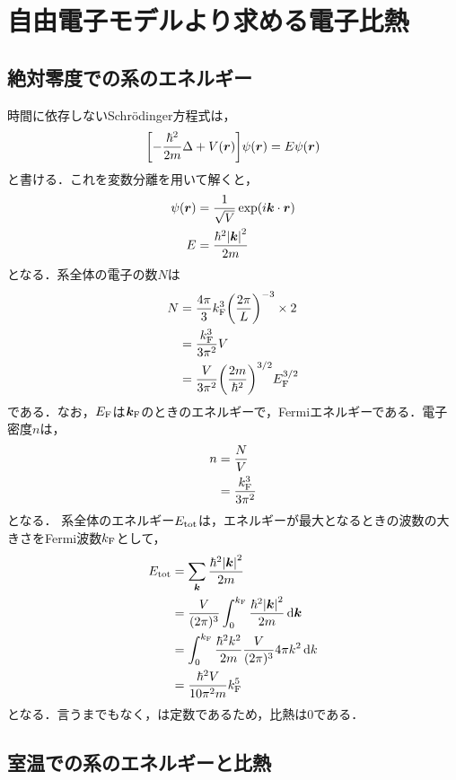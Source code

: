 \documentclass{report}
\begin{document}
  \chapter{自由電子モデルより求める電子比熱}
    \section{絶対零度での系のエネルギー}
      時間に依存しないSchr\"odinger方程式は，
      \begin{align}
        \qty[-\frac{\hbar^2}{2m}\Delta + V(\bm{r})]\psi(\bm{r}) = E\psi(\bm{r})
      \end{align}
      と書ける．これを変数分離を用いて解くと，
      \begin{align}
        \psi(\bm{r}) &= \frac{1}{\sqrt{V}}\exp(i\bm{k}\cdot\bm{r}) \\ 
        E &= \frac{\hbar^2\abs{\bm{k}}^2}{2m}
      \end{align}
      となる．系全体の電子の数$N$は
      \begin{align}
        N &= \frac{4\pi}{3}k_{\mathrm{F}}^3   \qty(\frac{2\pi}{L})^{-3} \times 2 \\ 
        &= \frac{k_{\mathrm{F}}^3}{3\pi^2}V \\ 
        &= \frac{V}{3\pi^2}\qty(\frac{2m}{\hbar^2})^{3/2}E_{\mathrm{F}}^{3/2} \label{electron-number}
      \end{align}
      である．なお，$E_{\mathrm{F}}$は$\bm{k}_{\mathrm{F}}$のときのエネルギーで，Fermiエネルギーである．電子密度$n$は，
      \begin{align}
        n &= \frac{N}{V} \\ 
        &= \frac{k_{\mathrm{F}}^3}{3\pi^2} \label{electron-density}
      \end{align}
      となる．
      系全体のエネルギー$E_{\mathrm{tot}}$は，エネルギーが最大となるときの波数の大きさをFermi波数$k_{\mathrm{F}}$として，
      \begin{align}
        E_{\mathrm{tot}} &= \sum_{\bm{k}}\frac{\hbar^2\abs{\bm{k}}^2}{2m} \\
        &= \frac{V}{(2\pi)^3}\int_{0}^{k_{\mathrm{F}}} \frac{\hbar^2\abs{\bm{k}}^2}{2m} \dd{\bm{k}}\\
        &= \int_{0}^{k_{\mathrm{F}}} \frac{\hbar^2k^2}{2m} \frac{V}{(2\pi)^3}4\pi k^2 \dd{k} \\
        &= \frac{\hbar^2 V}{10\pi^2m}k_{\mathrm{F}}^5 \label{electron-energy}
      \end{align}
      となる．言うまでもなく，は定数であるため，比熱は$0$である．
    \section{室温での系のエネルギーと比熱}
\end{document}
